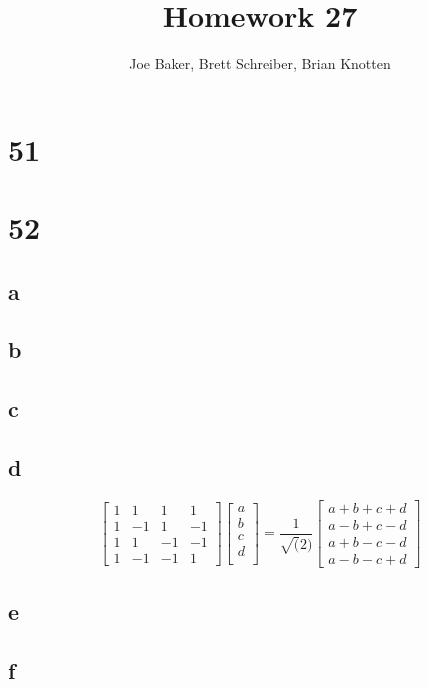 \documentclass[letterpaper,notitlepage,twoside]{article}
\begin{document}
\title{Homework 27}
\author{Joe Baker, Brett Schreiber, Brian Knotten}
\maketitle

\section*{51}

\section*{52}
\subsection*{a}
\subsection*{b}
\subsection*{c}
\subsection*{d}
\[
\begin{bmatrix}
1 &  1 &  1 &  1 \\
1 & -1 &  1 & -1 \\
1 &  1 & -1 & -1 \\
1 & -1 & -1 &  1 
\end{bmatrix}
\begin{bmatrix}
a \\
b \\
c \\
d \\
\end{bmatrix}
= \frac{1}{\sqrt(2)}
\begin{bmatrix}
a + b + c + d \\
a - b + c - d \\
a + b - c - d \\
a - b - c + d
\end{bmatrix}
\]
\subsection*{e}
\subsection*{f}
\end{document}
